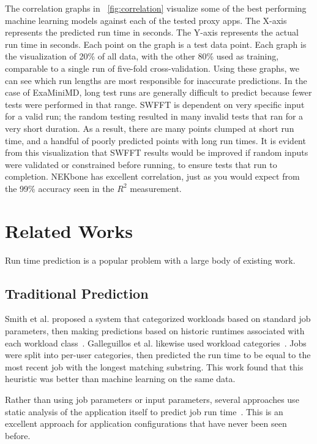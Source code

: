 \documentclass[conference, 10pt, onecolumn, draftclsnofoot]{IEEEtran}
\begin{document}
The correlation graphs in \figurename~\ref{fig:correlation} visualize some of the best performing machine learning models against each of the tested proxy apps.
The X-axis represents the predicted run time in seconds.
The Y-axis represents the actual run time in seconds.
Each point on the graph is a test data point.
Each graph is the visualization of 20\% of all data, with the other 80\% used as training, comparable to a single run of five-fold cross-validation.
Using these graphs, we can see which run lengths are most responsible for inaccurate predictions.
In the case of ExaMiniMD, long test runs are generally difficult to predict because fewer tests were performed in that range.
SWFFT is dependent on very specific input for a valid run; the random testing resulted in many invalid tests that ran for a very short duration.
As a result, there are many points clumped at short run time, and a handful of poorly predicted points with long run times.
It is evident from this visualization that SWFFT results would be improved if random inputs were validated or constrained before running, to ensure tests that run to completion.
NEKbone has excellent correlation, just as you would expect from the 99\% accuracy seen in the $R^2$ measurement.

\section{Related Works}

Run time prediction is a popular problem with a large body of existing work.

\subsection{Traditional Prediction}

Smith et al. proposed a system that categorized workloads based on standard job parameters, then making predictions based on historic runtimes associated with each workload class~\cite{SMITH20041007}.
Galleguillos et al. likewise used workload categories~\cite{galleguillos2017data}.
Jobs were split into per-user categories, then predicted the run time to be equal to the most recent job with the longest matching substring.
This work found that this heuristic was better than machine learning on the same data.

Rather than using job parameters or input parameters, several approaches use static analysis of the application itself to predict job run time~\cite{10.1145/3200921.3200937, 9196294}.
This is an excellent approach for application configurations that have never been seen before.
\end{document}
